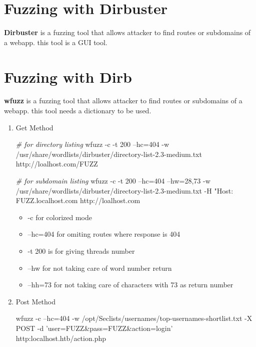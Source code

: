 \documentclass{assets/ipesethesis}
\newenvironment{Shaded}{\begin{snugshade}}{\end{snugshade}}
\newcommand{\CommentTok}[1]{\textcolor[rgb]{0.56,0.35,0.01}{\textit{#1}}}
\newcommand{\ExtensionTok}[1]{#1}
\newcommand{\NormalTok}[1]{#1}
\newcommand{\StringTok}[1]{\textcolor[rgb]{0.31,0.60,0.02}{#1}}
\providecommand{\tightlist}{%
  \setlength{\itemsep}{0pt}\setlength{\parskip}{0pt}}
\begin{document}
\hypertarget{fuzzing-with-dirbuster}{%
\section*{Fuzzing with Dirbuster}\label{fuzzing-with-dirbuster}}

\textbf{Dirbuster} is a fuzzing tool that allows attacker to find routes or subdomains of a webapp. this tool is a GUI tool.

\hypertarget{fuzzing-with-dirb}{%
\section*{Fuzzing with Dirb}\label{fuzzing-with-dirb}}

\textbf{wfuzz} is a fuzzing tool that allows attacker to find routes or subdomains of a webapp. this tool needs a dictionary to be used.

\begin{enumerate}
\def\labelenumi{\arabic{enumi}.}
\item
  Get Method

\begin{Shaded}
\begin{Highlighting}[]
\CommentTok{# for directory listing}
\ExtensionTok{wfuzz}\NormalTok{ -c -t 200 --hc=404 -w /usr/share/wordlists/dirbuster/directory-list-2.3-medium.txt http://loalhost.com/FUZZ}

\CommentTok{# for subdomain listing}
\ExtensionTok{wfuzz}\NormalTok{ -c -t 200 --hc=404 --hw=28,73 -w /usr/share/wordlists/dirbuster/directory-list-2.3-medium.txt -H }\StringTok{"Host: FUZZ.localhost.com http://loalhost.com}
\end{Highlighting}
\end{Shaded}

  \begin{itemize}
  \tightlist
  \item
    -c for colorized mode
  \item
    --hc=404 for omiting routes where response is 404
  \item
    -t 200 is for giving threads number
  \item
    --hw for not taking care of word number return
  \item
    --hh=73 for not taking care of characters with 73 as return number
  \end{itemize}
\item
  Post Method

\begin{Shaded}
\begin{Highlighting}[]
\ExtensionTok{wfuzz}\NormalTok{ -c --hc=404 -w /opt/Seclists/usernames/top-usernames-shortlist.txt -X POST -d }\StringTok{'user=FUZZ&pass=FUZZ&action=login'}\NormalTok{ http:localhost.htb/action.php}
\end{Highlighting}
\end{Shaded}
\end{enumerate}
\end{document}

